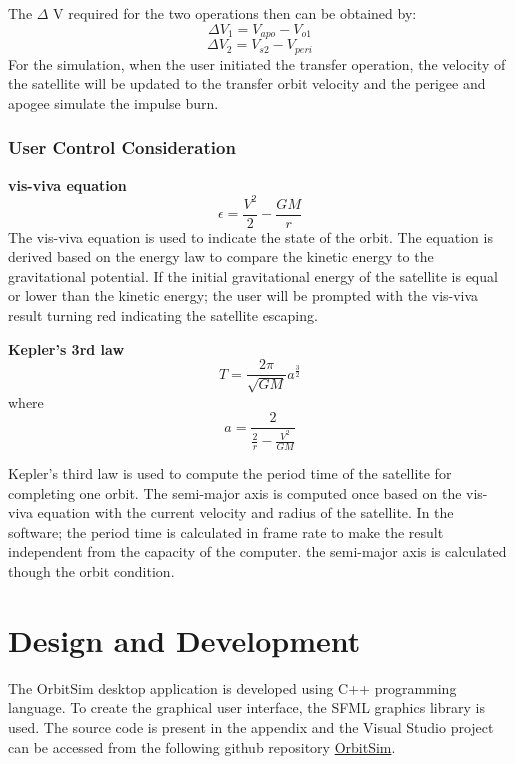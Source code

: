 \documentclass[12pt, letter]{article}
\begin{document}
The $\Delta$ V required for the two operations then can be obtained by:
\begin{equation} \label{eq:Transfer velocity 1}
\Delta V_1=V_{apo}-V_{o1}
\end{equation}
\begin{equation} \label{eq:Transfer velocity 2}
\Delta V_2=V_{s2}-V_{peri}
\end{equation}
For the simulation, when the user initiated the transfer operation, the velocity of the satellite will be updated to the transfer orbit velocity and the perigee and apogee simulate the impulse burn. 


\subsubsection {User Control Consideration}
\noindent \textbf{vis-viva equation}
\begin{equation} \label{eq:visviva}
\epsilon=\frac{V^2}{2}-\frac{GM}{r}
\end{equation}
The vis-viva equation is used to indicate the state of the orbit. The equation is derived based on the energy law to compare the kinetic energy to the gravitational potential. If the initial gravitational energy of the satellite is equal or lower than the kinetic energy; the user will be prompted with the vis-viva result turning red indicating the satellite escaping.

\noindent \textbf{Kepler’s 3rd law}
\begin{equation} \label{eq:kepler3rd}
T=\frac{2\pi}{\sqrt{GM}}a^{\frac{3}{2}}
\end{equation}
where
\begin{equation} \label{eq:semi_major_axis}
a=\frac{2}{\frac{2}{r}-\frac{V^2}{GM}}
\end{equation}

Kepler’s third law is used to compute the period time of the satellite for completing one orbit. The semi-major axis is computed once  based on the vis-viva equation with the current velocity and radius of the satellite. In the software; the period time is calculated in frame rate to make the result independent from the capacity of the computer. the semi-major axis is calculated though the orbit condition.


\clearpage



\section{Design and Development}
The OrbitSim desktop application is developed using C++ programming language. To create the graphical user interface, the SFML graphics library is used. The source code is present in the appendix and the Visual Studio project can be accessed from the following github repository \href{https://github.com/paramvirlobana/SpacePropulsion-W2024}{OrbitSim}.
\end{document}
